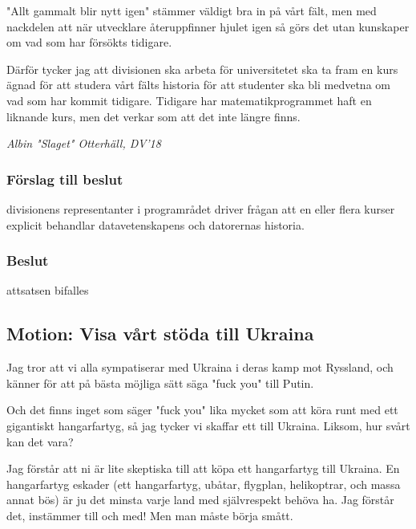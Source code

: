 \documentclass[protokoll]{dvd}
\begin{document}
"Allt gammalt blir nytt igen" stämmer väldigt bra in på vårt fält, men med nackdelen att när utvecklare återuppfinner hjulet igen så görs det utan kunskaper om vad som har försökts tidigare.

Därför tycker jag att divisionen ska arbeta för universitetet ska ta fram en kurs ägnad för att studera vårt fälts historia för att studenter ska bli medvetna om vad som har kommit tidigare.
Tidigare har matematikprogrammet haft en liknande kurs, men det verkar som att det inte längre finns.

\emph{Albin "Slaget" Otterhäll, DV'18} \\

    \subsubsection*{Förslag till beslut}
        \begin{attsatser}
            \item divisionens representanter i programrådet driver frågan att en eller flera kurser explicit behandlar datavetenskapens och datorernas historia.
        \end{attsatser}

    \subsubsection*{Beslut}
        \begin{attsatser}
            \item attsatsen bifalles
        \end{attsatser}

\newpage

\subsection{Motion: Visa vårt stöda till Ukraina}

Jag tror att vi alla sympatiserar med Ukraina i deras kamp mot Ryssland, och känner för att på bästa möjliga sätt säga "fuck you" till Putin.

Och det finns inget som säger "fuck you" lika mycket som att köra runt med ett gigantiskt hangarfartyg, så jag tycker vi skaffar ett till Ukraina.
Liksom, hur svårt kan det vara?

Jag förstår att ni är lite skeptiska till att köpa ett hangarfartyg till Ukraina.
En hangarfartyg eskader (ett hangarfartyg, ubåtar, flygplan, helikoptrar, och massa annat bös) är ju det minsta varje land med självrespekt behöva ha.
Jag förstår det, instämmer till och med!
Men man måste börja smått.
\end{document}
